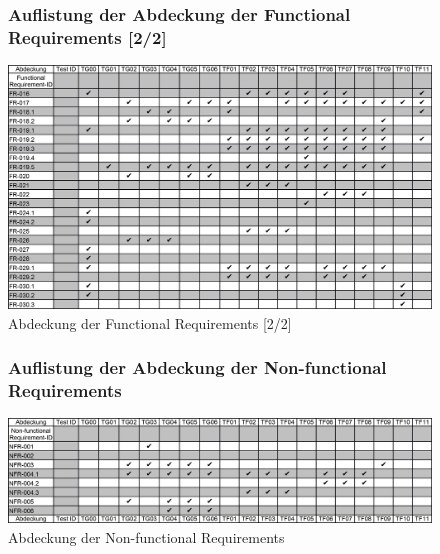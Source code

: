 \documentclass[oneside,a4paper,titlepage]{scrartcl}              %
\begin{document}
\begin{figure}[p]
  \subsubsection{Auflistung der Abdeckung der Functional Requirements [2/2]}
  \centering\includegraphics[angle=90,scale=0.305]{imgs/Req_Test_Abdeckung_2.png}
  \caption{Abdeckung der Functional Requirements [2/2]}
\end{figure}

\begin{figure}[p]
  \subsubsection{Auflistung der Abdeckung der Non-functional Requirements}
  \centering\includegraphics[angle=90,scale=0.305]{imgs/Req_Test_Abdeckung_3.png}
  \caption{Abdeckung der Non-functional Requirements}
\end{figure}

\newpage

\end{document}
